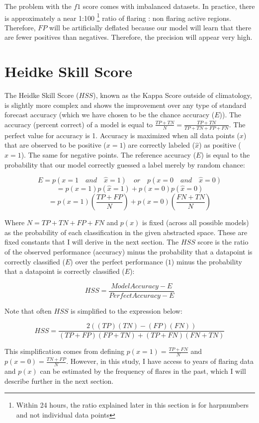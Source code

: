 The problem with the $f1$ score comes with imbalanced datasets. In practice, there is approximately a near 1:100 \footnote{Within 24 hours, the ratio explained later in this section is for harpnumbers and not individual data points} ratio of flaring : non flaring active regions. Therefore, $FP$ will be artificially deflated because our model will learn that there are fewer positives than negatives. Therefore, the precision will appear very high. 

\section{Heidke Skill Score}
The Heidke Skill Score ($HSS$), known as the Kappa Score outside of climatology, is slightly more complex and shows the improvement over any type of standard forecast accuracy (which we have chosen to be the chance accuracy ($E$)). The accuracy (percent correct) of a model is equal to $\frac{TP + TN}{N} = \frac{TP + TN}{TP + TN + FP + FN}$. The perfect value for accuracy is 1. Accuracy is maximized when all data points ($x$) that are observed to be positive ($x = 1$) are correctly labeled ($\hat{x}$) as positive ($\hat{x} = 1$). The same for negative points. The reference accuracy ($E$) is equal to the probability that our model correctly guessed a label merely by random chance:

$$E = p(x = 1 \quad and \quad \hat{x} = 1) \quad or \quad p(x = 0 \quad and \quad \hat{x} = 0)$$
$$= p(x = 1)p(\hat{x} = 1) + p(x = 0)p(\hat{x} = 0)$$
$$ = p(x = 1)(\frac{TP + FP}{N}) + p(x = 0)(\frac{FN + TN}{N})$$

Where $N = TP + TN + FP + FN$ and $p(x)$ is fixed (across all possible models) as the probability of each classification in the given abstracted space. These are fixed constants that I will derive in the next section. The $HSS$ score is the ratio of the observed performance (accuracy) minus the probability that a datapoint is correctly classified ($E$) over the perfect performance ($1$) minus the probability that a datapoint is correctly classified ($E$):

$$HSS = \frac{Model Accuracy - E}{Perfect Accuracy - E}$$

Note that often $HSS$ is simplified to the expression below:

$$HSS = \frac{2((TP)(TN)-(FP)(FN))}{(TP + FP)(FP + TN) + (TP + FN)(FN + TN)}$$

This simplification comes from defining $p(x = 1) = \frac{TP + FN}{N}$ and $p(x = 0) = \frac{TN + FP}{N}$. However, in this study, I have access to years of flaring data and $p(x)$ can be estimated by the frequency of flares in the past, which I will describe further in the next section.

